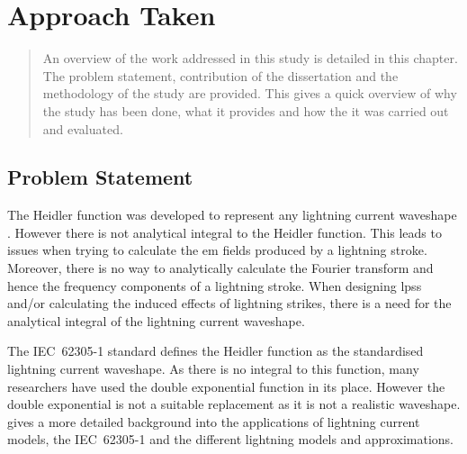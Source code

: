 
\chapter{Approach Taken} %

\label{ChapterApproach} %

\begin{quote}
An overview of the work addressed in this study is detailed in this chapter. The problem statement, contribution of the dissertation and the methodology of the study are provided. This gives a quick overview of why the study has been done, what it provides and how the it was carried out and evaluated.
\end{quote}


\section{Problem Statement}
\label{sec:approach_problem_statement}
The Heidler function was developed to represent any lightning current waveshape \cite{Heidler2002}. However there is not analytical integral to the Heidler function. This leads to issues when trying to calculate the \gls{em} fields produced by a lightning stroke. Moreover, there is no way to analytically calculate the Fourier transform and hence the frequency components of a lightning stroke. When designing \glspl{lps} and/or calculating the induced effects of lightning strikes, there is a need for the analytical integral of the lightning current waveshape.

The IEC~62305-1 standard defines the Heidler function as the standardised lightning current waveshape. As there is no integral to this function, many researchers have used the double exponential function in its place. However the double exponential is not a suitable replacement as it is not a realistic waveshape.  gives a more detailed background into the applications of lightning current models, the IEC~62305-1 and the different lightning models and approximations.

